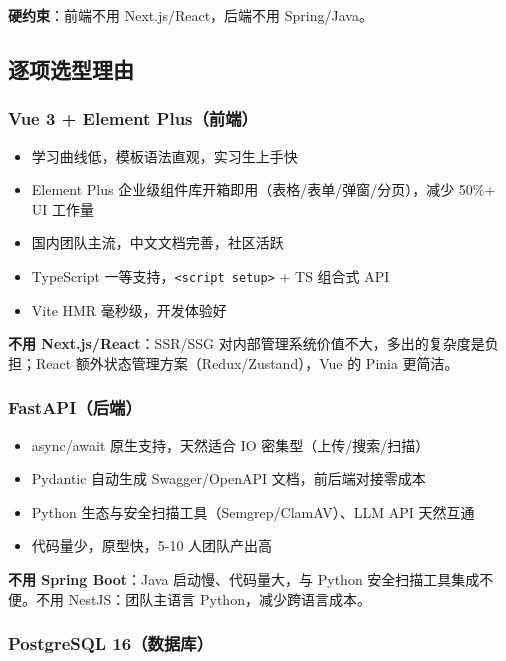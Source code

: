 \documentclass[11pt,a4paper]{article}
\begin{document}
\textbf{硬约束}：前端不用 Next.js/React，后端不用 Spring/Java。

\subsection{逐项选型理由}

\subsubsection{Vue 3 + Element Plus（前端）}

\begin{itemize}[nosep]
  \item 学习曲线低，模板语法直观，实习生上手快
  \item Element Plus 企业级组件库开箱即用（表格/表单/弹窗/分页），减少 50\%+ UI 工作量
  \item 国内团队主流，中文文档完善，社区活跃
  \item TypeScript 一等支持，\texttt{<script setup>} + TS 组合式 API
  \item Vite HMR 毫秒级，开发体验好
\end{itemize}

\textbf{不用 Next.js/React}：SSR/SSG 对内部管理系统价值不大，多出的复杂度是负担；React 额外状态管理方案（Redux/Zustand），Vue 的 Pinia 更简洁。

\subsubsection{FastAPI（后端）}

\begin{itemize}[nosep]
  \item async/await 原生支持，天然适合 IO 密集型（上传/搜索/扫描）
  \item Pydantic 自动生成 Swagger/OpenAPI 文档，前后端对接零成本
  \item Python 生态与安全扫描工具（Semgrep/ClamAV）、LLM API 天然互通
  \item 代码量少，原型快，5-10 人团队产出高
\end{itemize}

\textbf{不用 Spring Boot}：Java 启动慢、代码量大，与 Python 安全扫描工具集成不便。不用 NestJS：团队主语言 Python，减少跨语言成本。

\subsubsection{PostgreSQL 16（数据库）}
\end{document}
